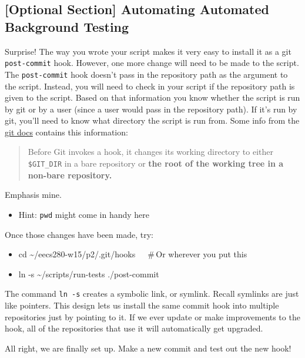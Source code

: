 \documentclass{article}
\begin{document}
\medskip

\subsection*{[Optional Section] Automating Automated Background Testing}
Surprise! The way you wrote your script makes it very easy to install it as a git
\texttt{post-commit} hook. However, one more change will need to be made to the
script. The \texttt{post-commit} hook doesn't pass in the repository path as the
argument to the script. Instead, you will need to check in your script if the
repository path is given to the script. Based on that information you know
whether the script is run by git or by a user (since a user would pass in the
repository path). If it's run by git, you'll need to know what directory the
script is run from. Some info from the
\href{https://git-scm.com/docs/githooks}{git docs} contains this information:

\begin{quote}
    Before Git invokes a hook, it changes its working directory to either
    \texttt{\$GIT\_DIR} in a bare repository or \textbf{the root of the working tree in a
    non-bare repository.}
\end{quote}

\noindent
Emphasis mine.

\begin{itemize}
    \item Hint: \texttt{pwd} might come in handy here
\end{itemize}

\medskip

\noindent
Once those changes have been made, try:

\begin{itemize}\tt
    \item cd \textasciitilde/eecs280-w15/p2/.git/hooks~~~\#\,Or wherever you put this
    \item ln -s \textasciitilde/scripts/run-tests ./post-commit
\end{itemize}

\noindent
The command \texttt{ln -s} creates a symbolic link, or symlink. Recall
symlinks are just like pointers. This design lets us install the same commit
hook into multiple repositories just by pointing to it. If we ever update or
make improvements to the hook, all of the repositories that use it will
automatically get upgraded.

\medskip

\noindent
All right, we are finally set up. Make a new commit and test out the new hook!
\end{document}
